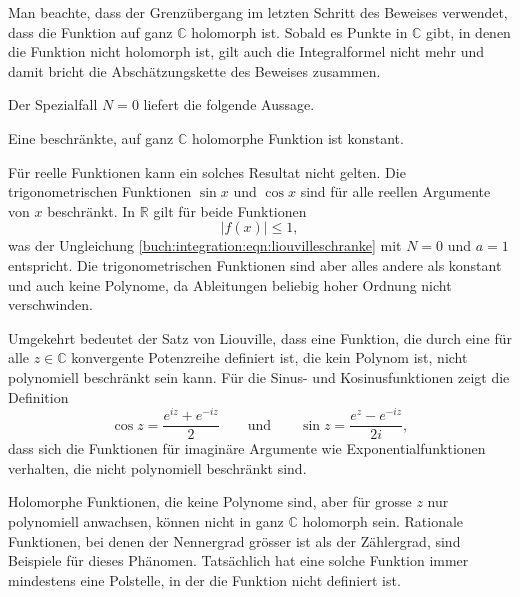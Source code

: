 Man beachte, dass der Grenzübergang im letzten Schritt des Beweises 
verwendet, dass die Funktion auf ganz $\mathbb{C}$ holomorph ist.
Sobald es Punkte in $\mathbb{C}$ gibt, in denen die Funktion nicht
holomorph ist, gilt auch die Integralformel nicht mehr und damit
bricht die Abschätzungskette des Beweises zusammen.

Der Spezialfall $N=0$ liefert die folgende Aussage.

\begin{korollar}
Eine beschränkte, auf ganz $\mathbb{C}$ holomorphe Funktion ist
konstant.
\end{korollar}

Für reelle Funktionen kann ein solches Resultat nicht gelten.
Die trigonometrischen Funktionen $\sin x$ und $\cos x$ sind
für alle reellen Argumente von $x$ beschränkt.
In $\mathbb{R}$ gilt für beide Funktionen
\[
|f(x)| \le 1,
\]
was der Ungleichung
\eqref{buch:integration:eqn:liouvilleschranke}
mit $N=0$ und $a=1$ entspricht.
Die trigonometrischen Funktionen sind aber alles andere als konstant
und auch keine Polynome, da Ableitungen beliebig hoher Ordnung nicht
verschwinden.

Umgekehrt bedeutet der Satz von Liouville, dass eine Funktion,
die durch eine für alle $z\in\mathbb{C}$ konvergente Potenzreihe
definiert ist, die kein Polynom ist, nicht polynomiell beschränkt
sein kann.
Für die Sinus- und Kosinusfunktionen zeigt die Definition
\[
\cos z = \frac{e^{iz}+e^{-iz}}{2}
\qquad\text{und}\qquad
\sin z = \frac{e^{z}-e^{-iz}}{2i},
\]
dass sich die Funktionen für imaginäre Argumente wie Exponentialfunktionen
verhalten, die nicht polynomiell beschränkt sind.

Holomorphe Funktionen, die keine Polynome sind, aber für grosse $z$
nur polynomiell anwachsen, können nicht in ganz $\mathbb{C}$
holomorph sein.
Rationale Funktionen, bei denen der Nennergrad grösser ist als der
Zählergrad, sind Beispiele für dieses Phänomen.
Tatsächlich hat eine solche Funktion immer mindestens eine Polstelle,
in der die Funktion nicht definiert ist.
